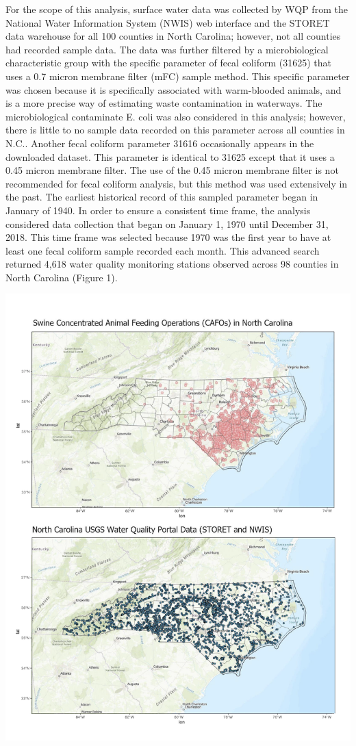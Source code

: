 \documentclass[12pt,]{article}
\begin{document}
For the scope of this analysis, surface water data was collected by WQP
from the National Water Information System (NWIS) web interface and the
STORET data warehouse for all 100 counties in North Carolina; however,
not all counties had recorded sample data. The data was further filtered
by a microbiological characteristic group with the specific parameter of
fecal coliform (31625) that uses a 0.7 micron membrane filter (mFC)
sample method. This specific parameter was chosen because it is
specifically associated with warm-blooded animals, and is a more precise
way of estimating waste contamination in waterways. The microbiological
contaminate E. coli was also considered in this analysis; however, there
is little to no sample data recorded on this parameter across all
counties in N.C.. Another fecal coliform parameter 31616 occasionally
appears in the downloaded dataset. This parameter is identical to 31625
except that it uses a 0.45 micron membrane filter. The use of the 0.45
micron membrane filter is not recommended for fecal coliform analysis,
but this method was used extensively in the past. The earliest
historical record of this sampled parameter began in January of 1940. In
order to ensure a consistent time frame, the analysis considered data
collection that began on January 1, 1970 until December 31, 2018. This
time frame was selected because 1970 was the first year to have at least
one fecal coliform sample recorded each month. This advanced search
returned 4,618 water quality monitoring stations observed across 98
counties in North Carolina (Figure 1). \newpage

\includegraphics{swine_CAFO.png} \newpage
\end{document}
